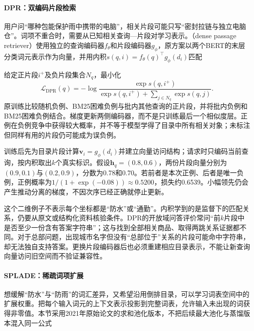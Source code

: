 \Needspace{100mm}
\paragraph{DPR：双编码片段检索}
\label{sec:rs-search-dpr}

用户问“哪种包能保护雨中携带的电脑”，相关片段可能只写“密封拉链与独立电脑仓”。词项不重合时，需要从已知相关查询—片段对学习表示。（dense passage retriever）使用独立的查询编码器$f_\theta$和片段编码器$g_\phi$，原方案以两个BERT的末层分类词元表示作为向量，并用内积$s(q,i)=f_\theta(q)^\top g_\phi(d_i)$匹配

给定正片段$i^+$及负片段集合$N_q$，最小化
\begin{equation}
 \mathcal L_{\mathrm{DPR}}(q)=
 -\log\frac{\exp s(q,i^+)}
 {\exp s(q,i^+)+\sum_{j\in N_q}\exp s(q,j)} .
 \label{eq:rs-search-dpr}
\end{equation}
原训练比较随机负例、BM25困难负例与批内其他查询的正片段，并将批内负例和BM25困难负例结合。梯度更新两侧编码器，而不是只训练最后一个相似度层。正例在负例竞争中获得较大概率，并不等于模型学得了目录中所有相关对象；未标注但同样有用的片段仍可能成为误负例。

训练后先为目录片段计算$\bm v_i=g_\phi(d_i)$并建立向量访问结构；请求时只编码当前查询，按内积取出$k$个真实标识。假设$\bm h_q=(0.8,0.6)$，两份片段向量分别为$(0.9,0.1)$与$(0.2,0.9)$，分数为0.78和0.70。若前者是本次正例、后者是唯一负例，正例概率为$1/(1+\exp(-0.08))\approx0.5200$，损失约0.6539。小幅领先仍会产生推动分离的梯度，不因次序已经正确就停止更新。

这个二维例子不表示每个坐标都是“防水”或“通勤”。内积学到的是监督下的匹配关系，仍要从原文或结构化资料核验条件。DPR的开放域问答评价常问“前$k$片段中是否至少一份含有答案字符串”；这与找到全部相关商品、取得两跳关系证据都不同。对于总部问题，出现城市名字但没有“总部位于”关系的片段可能命中字符串，却无法独自支持答案。更换片段编码器后也必须重建相应目录表示，不能让新查询向量访问旧空间而不验证兼容性。

\Needspace{100mm}
\paragraph{SPLADE：稀疏词项扩展}
\label{sec:rs-search-splade}

想缓解“防水”与“防雨”的词汇差异，又希望沿用倒排目录，可以学习词表空间中的扩展权重。把每个输入词元的上下文表示投影到完整词表，允许输入未出现的词获得非零值。本节采用2021年原始论文的求和池化版本，不把后续最大池化与蒸馏版本混入同一公式

